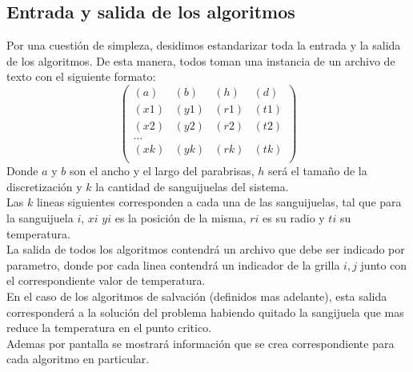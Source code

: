 \subsection{Entrada y salida de los algoritmos}

Por una cuestión de simpleza, desidimos estandarizar toda la entrada y la salida de los algoritmos. De esta manera, todos toman una instancia de un archivo de texto con el siguiente formato:
$$
\begin{pmatrix}
 (a) & (b) & (h) & (d) \\
 (x1) & (y1) & (r1) & (t1) \\
 (x2) & (y2) & (r2) & (t2) \\
...\\
 (xk) & (yk) & (rk) & (tk) \\
\end{pmatrix}
$$
Donde $a$ y $b$ son el ancho y el largo del parabrisas, $h$ será el tamaño de la discretización y $k$ la cantidad de sanguijuelas del sistema.
\\
Las $k$ lineas siguientes corresponden a cada una de las sanguijuelas, tal que para la sanguijuela $i$, $xi$ $yi$ es la posición de la misma, $ri$ es su radio y $ti$ su temperatura.
\\
La salida de todos los algoritmos contendrá un archivo que debe ser indicado por parametro, donde por cada linea contendrá un indicador de la grilla $i,j$ junto con el correspondiente valor de temperatura.
\\
En el caso de los algoritmos de salvación (definidos mas adelante), esta salida corresponderá a la solución del problema habiendo quitado la sangijuela que mas reduce la temperatura en el punto critico.
\\
Ademas por pantalla se mostrará información que se crea correspondiente para cada algoritmo en particular.